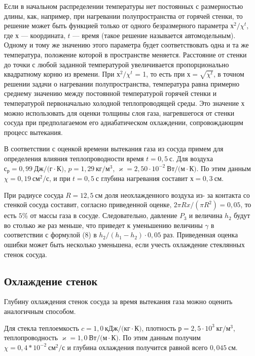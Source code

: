 \documentclass[a4paper,12pt]{article}
\theoremstyle{plain} %
\theoremstyle{definition} %
\theoremstyle{remark} %
\begin{document}
Если в начальном распределении температуры нет постоянных с размерностью длины, как, например, при нагревании полупространства от горячей стенки, то решение может быть функцией только от одного безразмерного параметра $х^2/\chi^t$, где $х$ — координата, $t$ — время (такое решение называется автомодельным). Одному и тому же значению этого параметра будет соответствовать одна и та же температура, положение которой в пространстве меняется. Расстояние от стенки до точки с любой заданной температурой увеличивается пропорционально квадратному корню из времени. При $х^2/\chi^t$ = 1, то есть при $х = \sqrt{\chi^t}$, в точном решении задачи о нагревании полупространства, температура равна примерно среднему значению между постоянной температурой горячей стенки и температурой первоначально холодной теплопроводящей среды. Это значение $х$ можно использовать для оценки толщины слоя газа, нагревшегося от стенки сосуда при предполагаемом его адиабатическом охлаждении, сопровождающим процесс вытекания.

В соответствии с оценкой времени вытекания газа из сосуда примем для определения влияния теплопроводности время $t = 0,5\ \text{с}$. Для воздуха $с_р = 0,99\ \text{Дж}/\text{(г}\cdot\text{К)}$, $p = 1,29\ \text{кг}/\text{м}^3$, $\varkappa = 2,50 \cdot 10^{-2}\ \text{Вт}/\text{(м}\cdot\text{К)}$. По этим данным $\chi = 0,19\  \text{см}^2/\text{с}$, и при $t = 0,5\ \text{с}$ глубина нагревания составит $х = 0,3\ \text{см}$.

При радиусе сосуда $R = 12,5\ \text{см}$ доля неохлажденного воздуха из- за контакта со стенкой сосуда составит, согласно приведенной оценке, $2\pi Rx/(\pi R^2) = 0,05$, то есть $5\%$ от массы газа в сосуде. Следовательно, давление $P_3$ и величина $h_2$ будут во столько же раз меньше, что приведет к уменьшению величины $\gamma$ в соответствии с формулой (8) в $h_2/(h_1 - h_2) \cdot 0,05$ раз. Приведенная оценка ошибки может быть несколько уменьшена, если учесть охлаждение стеклянных стенок сосуда.

\subsection{Охлаждение стенок}

Глубину охлаждения стенок сосуда за время вытекания газа можно оценить аналогичным способом.

Для стекла теплоемкость $c = 1,0\ \text{кДж}/\text{(кг}\cdot \text{К)}$, плотность $р = 2,5\cdot10^3\ \text{кг}/\text{м}^3$, теплопроводность $\varkappa = 1,0\ \text{Вт}/\text{(м}\cdot \text{К)}$. По этим данным получим $\chi = 0,4 * 10^{-2}\ \text{см}^2/\text{с}$ и глубина охлаждения получится равной всего $0,045\ \text{см}$.
\end{document}
